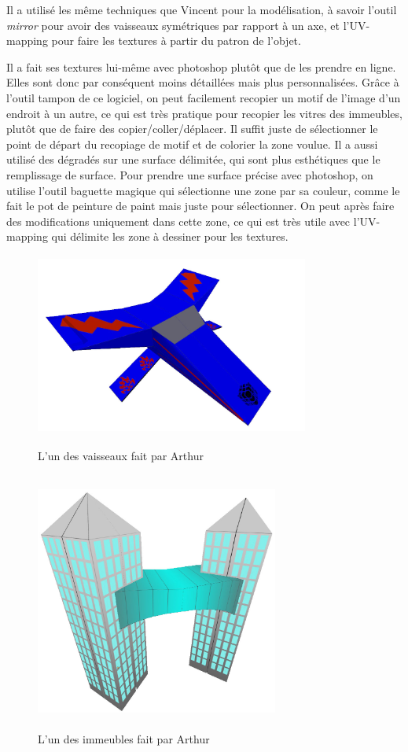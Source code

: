 \documentclass[10pt, titlepage]{report}
\begin{document}
Il a utilisé les même techniques que Vincent pour la modélisation, à savoir l'outil \textit{mirror} pour avoir des vaisseaux symétriques par rapport à un axe, et  l'UV-mapping pour faire les textures à partir du patron de l'objet.

Il a fait ses textures lui-même avec photoshop plutôt que de les prendre en ligne. Elles sont donc par conséquent moins détaillées mais plus personnalisées. Grâce à l'outil tampon de ce logiciel, on peut facilement recopier un motif de l'image d'un endroit à un autre, ce qui est très pratique pour recopier les vitres des immeubles, plutôt que de faire des copier/coller/déplacer. Il suffit juste de sélectionner le point de départ du recopiage de motif et de colorier la zone voulue. Il a aussi utilisé des dégradés sur une surface délimitée, qui sont plus esthétiques que le remplissage de surface. Pour prendre une surface précise avec photoshop, on utilise l'outil baguette magique qui sélectionne une zone par sa couleur, comme le fait le pot de peinture de paint mais juste pour sélectionner. On peut après faire des modifications uniquement dans cette zone, ce qui est très utile avec l'UV-mapping qui délimite les zone à dessiner pour les textures.\\

\begin{figure}
\center
\includegraphics[height=6cm, width=9cm]{vaisseau_arthur.jpg}
\caption{L'un des vaisseaux fait par Arthur}

\includegraphics[height=8.5cm, width=8cm]{batiment_arthur.jpg}
\caption{L'un des immeubles fait par Arthur}

\end{figure}
\end{document}
